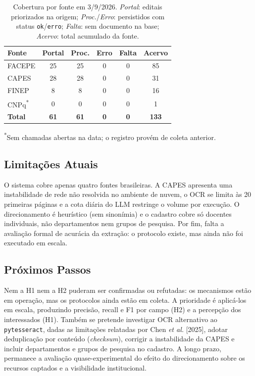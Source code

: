 \documentclass[12pt]{article}
\begin{document}
  \begin{table}[t]
  \caption{Cobertura por fonte em 3/9/2026. \emph{Portal}: editais priorizados na origem; \emph{Proc.}/\emph{Erro}: persistidos com status \texttt{ok}/\texttt{erro}; \emph{Falta}: sem documento na base; \emph{Acervo}: total acumulado da fonte.}
  \label{tab:cobertura}
  \centering
  \begin{tabular}{lccccc}
  \hline
  \textbf{Fonte} & \textbf{Portal} & \textbf{Proc.} & \textbf{Erro} & \textbf{Falta} & \textbf{Acervo} \\
  \hline
  FACEPE & 25 & 25 & 0 & 0 & 85 \\
  CAPES  & 28 & 28 & 0 & 0 & 31 \\
  FINEP  & 8  & 8  & 0 & 0 & 16 \\
  CNPq\textsuperscript{*} & 0 & 0 & 0 & 0 & 1 \\
  \hline
  \textbf{Total} & \textbf{61} & \textbf{61} & \textbf{0} & \textbf{0} & \textbf{133} \\
  \hline
  \end{tabular}

  \vspace{2pt}
  {\footnotesize \textsuperscript{*}Sem chamadas abertas na data; o registro provém de coleta anterior.}
  \end{table}

  \subsection{Limitações Atuais}\label{sec:limitacoes}
  O sistema cobre apenas quatro fontes brasileiras. A CAPES apresenta uma instabilidade de rede não resolvida no ambiente de nuvem, o OCR se limita às 20 primeiras páginas e a cota diária do LLM restringe o volume por execução. O direcionamento é heurístico (sem sinonímia) e o cadastro cobre só docentes individuais, não departamentos nem grupos de pesquisa. Por fim, falta a avaliação formal de acurácia da extração: o protocolo existe, mas ainda não foi executado em escala.

  \subsection{Próximos Passos}\label{sec:trabalhos-futuros}
  Nem a H1 nem a H2 puderam ser confirmadas ou refutadas: os mecanismos estão em operação, mas os protocolos ainda estão em coleta. A prioridade é aplicá-los em escala, produzindo precisão, recall e F1 por campo (H2) e a percepção dos interessados (H1). Também se pretende investigar OCR alternativo ao \texttt{pytesseract}, dadas as limitações relatadas por Chen \emph{et al.} [2025], adotar deduplicação por conteúdo (\emph{checksum}), corrigir a instabilidade da CAPES e incluir departamentos e grupos de pesquisa no cadastro. A longo prazo, permanece a avaliação quase-experimental do efeito do direcionamento sobre os recursos captados e a visibilidade institucional.
\end{document}
